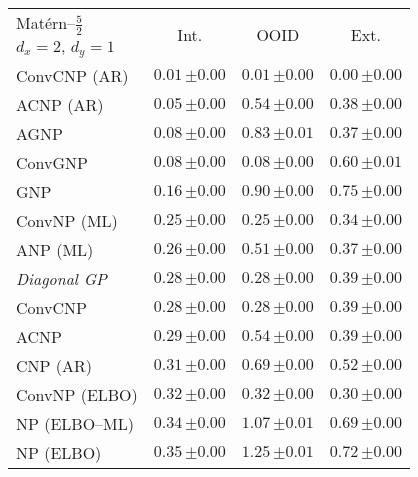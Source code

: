 \begin{tabular}[t]{lccc} 
\toprule 
Mat\'ern--$\tfrac52$ & \multirow{2}{*}{Int.} & \multirow{2}{*}{OOID} & \multirow{2}{*}{Ext.} \\ 
$d_x\!=\!2,\,d_y\!=\!1$ \\ \midrule 
ConvCNP (AR) & $\mathbf{0.01}\,{ \scriptstyle \pm  0.00 }$ & $\mathbf{0.01}\,{ \scriptstyle \pm  0.00 }$ & $\mathbf{0.00}\,{ \scriptstyle \pm  0.00 }$ \\ 
ACNP (AR) & $0.05\,{ \scriptstyle \pm  0.00 }$ & $0.54\,{ \scriptstyle \pm  0.00 }$ & $0.38\,{ \scriptstyle \pm  0.00 }$ \\ 
AGNP & $0.08\,{ \scriptstyle \pm  0.00 }$ & $0.83\,{ \scriptstyle \pm  0.01 }$ & $0.37\,{ \scriptstyle \pm  0.00 }$ \\ 
ConvGNP & $0.08\,{ \scriptstyle \pm  0.00 }$ & $0.08\,{ \scriptstyle \pm  0.00 }$ & $0.60\,{ \scriptstyle \pm  0.01 }$ \\ 
GNP & $0.16\,{ \scriptstyle \pm  0.00 }$ & $0.90\,{ \scriptstyle \pm  0.00 }$ & $0.75\,{ \scriptstyle \pm  0.00 }$ \\ 
ConvNP (ML) & $0.25\,{ \scriptstyle \pm  0.00 }$ & $0.25\,{ \scriptstyle \pm  0.00 }$ & $0.34\,{ \scriptstyle \pm  0.00 }$ \\ 
ANP (ML) & $0.26\,{ \scriptstyle \pm  0.00 }$ & $0.51\,{ \scriptstyle \pm  0.00 }$ & $0.37\,{ \scriptstyle \pm  0.00 }$ \\ 
{\normalshape \textit{Diagonal GP}} & $0.28\,{ \scriptstyle \pm  0.00 }$ & $0.28\,{ \scriptstyle \pm  0.00 }$ & $0.39\,{ \scriptstyle \pm  0.00 }$ \\ 
ConvCNP & $0.28\,{ \scriptstyle \pm  0.00 }$ & $0.28\,{ \scriptstyle \pm  0.00 }$ & $0.39\,{ \scriptstyle \pm  0.00 }$ \\ 
ACNP & $0.29\,{ \scriptstyle \pm  0.00 }$ & $0.54\,{ \scriptstyle \pm  0.00 }$ & $0.39\,{ \scriptstyle \pm  0.00 }$ \\ 
CNP (AR) & $0.31\,{ \scriptstyle \pm  0.00 }$ & $0.69\,{ \scriptstyle \pm  0.00 }$ & $0.52\,{ \scriptstyle \pm  0.00 }$ \\ 
ConvNP (ELBO) & $0.32\,{ \scriptstyle \pm  0.00 }$ & $0.32\,{ \scriptstyle \pm  0.00 }$ & $0.30\,{ \scriptstyle \pm  0.00 }$ \\ 
NP (ELBO--ML) & $0.34\,{ \scriptstyle \pm  0.00 }$ & $1.07\,{ \scriptstyle \pm  0.01 }$ & $0.69\,{ \scriptstyle \pm  0.00 }$ \\ 
NP (ELBO) & $0.35\,{ \scriptstyle \pm  0.00 }$ & $1.25\,{ \scriptstyle \pm  0.01 }$ & $0.72\,{ \scriptstyle \pm  0.00 }$ \\ 

\end{tabular}
